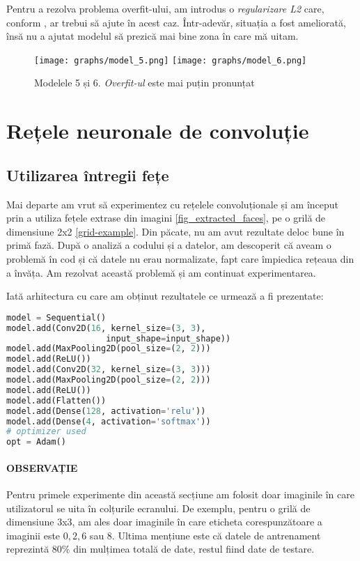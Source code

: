 Pentru a rezolva problema overfit-ului, am introdus o \emph{regularizare L2} care, conform \cite{l1_l2_regularisation}, ar trebui să ajute în acest caz.
Într-adevăr, situația a fost ameliorată, însă nu a ajutat modelul să prezică mai bine zona în care mă uitam.

\begin{figure}[h]
    \centering
    \texttt{[image: graphs/model\_5.png]}
    \texttt{[image: graphs/model\_6.png]}
    \caption{Modelele 5 și 6. \emph{Overfit-ul} este mai puțin pronunțat}
\end{figure}

\section{Rețele neuronale de convoluție}
\subsection{Utilizarea întregii fețe}

Mai departe am vrut să experimentez cu rețelele convoluționale și am început prin a utiliza fețele extrase din imagini \ref{fig_extracted_faces}, pe o grilă de dimensiune 2x2 \ref{grid-example}.
Din păcate, nu am avut rezultate deloc bune în primă fază.
După o analiză a codului și a datelor, am descoperit că aveam o problemă în cod și că datele nu erau normalizate, fapt care împiedica rețeaua din a învăța.
Am rezolvat această problemă și am continuat experimentarea.

Iată arhitectura cu care am obținut rezultatele ce urmează a fi prezentate:

\label{cnn_first_architecture}
\begin{lstlisting}[language=Python, caption=Prima arhitectură CNN]
model = Sequential()
model.add(Conv2D(16, kernel_size=(3, 3),
                    input_shape=input_shape))
model.add(MaxPooling2D(pool_size=(2, 2)))
model.add(ReLU())
model.add(Conv2D(32, kernel_size=(3, 3)))
model.add(MaxPooling2D(pool_size=(2, 2)))
model.add(ReLU())
model.add(Flatten())
model.add(Dense(128, activation='relu'))
model.add(Dense(4, activation='softmax'))
# optimizer used
opt = Adam()
\end{lstlisting}

\paragraph{OBSERVAȚIE}
Pentru primele experimente din această secțiune am folosit doar imaginile în care utilizatorul se uita în colțurile ecranului.
De exemplu, pentru o grilă de dimensiune 3x3, am ales doar imaginile în care eticheta corespunzătoare a imaginii este $0, 2, 6$ sau $8$.
Ultima mențiune este că datele de antrenament reprezintă $80\%$ din mulțimea totală de date, restul fiind date de testare.


